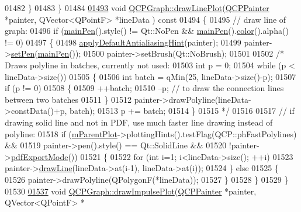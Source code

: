 \begin{DoxyCode}
01482   \}
01483 \}
01484 
\hypertarget{a00115_source_l01493}{}\hyperlink{a00031_acebc22c3385829b19a87e6281fe6ade2}{01493} \textcolor{keywordtype}{void} \hyperlink{a00031_acebc22c3385829b19a87e6281fe6ade2}{QCPGraph::drawLinePlot}(\hyperlink{a00047}{QCPPainter} *painter, QVector<QPointF> *lineData
      )\textcolor{keyword}{ const}
01494 \textcolor{keyword}{}\{
01495   \textcolor{comment}{// draw line of graph:}
01496   \textcolor{keywordflow}{if} (\hyperlink{a00024_a19276ed2382a3a06464417b8788b1451}{mainPen}().style() != Qt::NoPen && \hyperlink{a00024_a19276ed2382a3a06464417b8788b1451}{mainPen}().\hyperlink{a00116_ae35093fbf4f645dcefd930ca8c68b622}{color}().alpha() != 0)
01497   \{
01498     \hyperlink{a00024_a76e9d6cc7972dc1528f526d163766aca}{applyDefaultAntialiasingHint}(painter);
01499     painter->\hyperlink{a00047_af9c7a4cd1791403901f8c5b82a150195}{setPen}(\hyperlink{a00024_a19276ed2382a3a06464417b8788b1451}{mainPen}());
01500     painter->setBrush(Qt::NoBrush);
01501     
01502     \textcolor{comment}{/* Draws polyline in batches, currently not used:}
01503 \textcolor{comment}{    int p = 0;}
01504 \textcolor{comment}{    while (p < lineData->size())}
01505 \textcolor{comment}{    \{}
01506 \textcolor{comment}{      int batch = qMin(25, lineData->size()-p);}
01507 \textcolor{comment}{      if (p != 0)}
01508 \textcolor{comment}{      \{}
01509 \textcolor{comment}{        ++batch;}
01510 \textcolor{comment}{        --p; // to draw the connection lines between two batches}
01511 \textcolor{comment}{      \}}
01512 \textcolor{comment}{      painter->drawPolyline(lineData->constData()+p, batch);}
01513 \textcolor{comment}{      p += batch;}
01514 \textcolor{comment}{    \}}
01515 \textcolor{comment}{    */}
01516     
01517     \textcolor{comment}{// if drawing solid line and not in PDF, use much faster line drawing instead of polyline:}
01518     \textcolor{keywordflow}{if} (\hyperlink{a00044_aa2a528433e44db02b8aef23c1f9f90ed}{mParentPlot}->plottingHints().testFlag(QCP::phFastPolylines) &&
01519         painter->pen().style() == Qt::SolidLine &&
01520         !painter->\hyperlink{a00047_ac272648ed66f0602f2250de45cbbeb33}{pdfExportMode}())
01521     \{
01522       \textcolor{keywordflow}{for} (\textcolor{keywordtype}{int} i=1; i<lineData->size(); ++i)
01523         painter->\hyperlink{a00047_a0b4b1b9bd495e182c731774dc800e6e0}{drawLine}(lineData->at(i-1), lineData->at(i));
01524     \} \textcolor{keywordflow}{else}
01525     \{  
01526       painter->drawPolyline(QPolygonF(*lineData));
01527     \}
01528   \}
01529 \}
01530 
\hypertarget{a00115_source_l01537}{}\hyperlink{a00031_abc01180629621f1e47e94559227d3d8c}{01537} \textcolor{keywordtype}{void} \hyperlink{a00031_abc01180629621f1e47e94559227d3d8c}{QCPGraph::drawImpulsePlot}(\hyperlink{a00047}{QCPPainter} *painter, QVector<QPointF> *

\end{DoxyCode}
